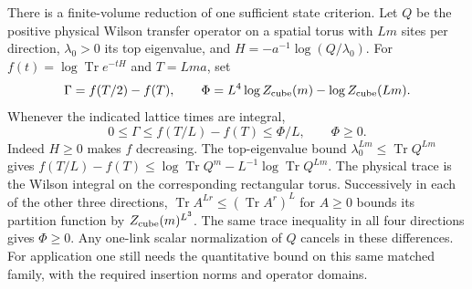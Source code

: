 \documentclass[11pt,letterpaper]{article}
\begin{document}

There is a finite-volume reduction of one sufficient state criterion.
Let \(Q\) be the positive physical Wilson transfer operator on a spatial
torus with \(Lm\) sites per direction, \(\lambda_0>0\) its top eigenvalue,
and \(H=-a^{-1}\log(Q/\lambda_0)\). For
\(f(t)=\log\operatorname{Tr}e^{-tH}\) and \(T=Lma\), set
\[
 \Gamma=f(T/2)-f(T),\qquad
 \Phi=L^4\log Z_{\rm cube}(m)-\log Z_{\rm cube}(Lm).
\]
Whenever the indicated lattice times are integral,
\[
             0\le\Gamma\le f(T/L)-f(T)\le \Phi/L,\qquad \Phi\ge0 .
\]
Indeed \(H\ge0\) makes \(f\) decreasing. The top-eigenvalue bound
\(\lambda_0^{Lm}\le\operatorname{Tr}Q^{Lm}\) gives
\(f(T/L)-f(T)\le\log\operatorname{Tr}Q^m
 -L^{-1}\log\operatorname{Tr}Q^{Lm}\).
The physical trace is the Wilson integral on the corresponding
rectangular torus. Successively in each of the other three directions,
\(\operatorname{Tr}A^{Lr}\le(\operatorname{Tr}A^r)^L\) for \(A\ge0\)
bounds its partition function by \(Z_{\rm cube}(m)^{L^3}\).
The same trace inequality in all four directions gives \(\Phi\ge0\).
Any one-link scalar normalization of \(Q\) cancels in these differences.
For application one still needs the quantitative bound on this same
matched family, with the required insertion norms and operator domains.


\end{document}
